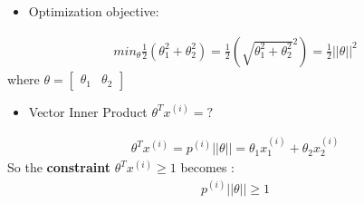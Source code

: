 \documentclass[a4paper,12pt]{report}
\begin{document}
\begin{itemize}
\item Optimization objective:
\end{itemize}
\begin{align}
min_{\theta} \frac{1}{2} (\theta_1 ^2 + \theta_2 ^2) = \frac{1}{2} (\sqrt{\theta_1 ^2 + \theta_2 ^2}^2) = \frac{1}{2} ||\theta||^2
\end{align}
where $\theta= \left[ \begin{smallmatrix} \theta_1 & \theta_2 \end{smallmatrix} \right]$

\begin{itemize}
\item Vector Inner Product $\theta^T x^{(i)} = ?$
\end{itemize}

\begin{align}
\theta^T x^{(i)} = p^{(i)} ||\theta|| = \theta_1 x^{(i)}_1 + \theta_2 x^{(i)} _2
\end{align}
So the \textbf{constraint} $\theta ^T x^{(i)} \geq 1$ becomes :
\begin{align}
p^{(i)} ||\theta|| \geq 1
\end{align}
\end{document}
